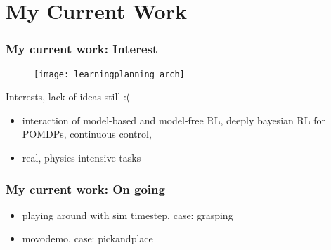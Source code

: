 \section{My Current Work}

\begin{frame}
\frametitle{My current work: Interest}

\begin{figure}
    \centering
    \texttt{[image: learningplanning\_arch]}
\end{figure}

Interests, lack of ideas still :(
\begin{itemize}
  \item interaction of model-based and model-free RL,
  deeply bayesian RL for POMDPs, continuous control,
  \item real, physics-intensive tasks
\end{itemize}
\end{frame}

\begin{frame}
\frametitle{My current work: On going}
\begin{itemize}
  \item playing around with sim timestep, case: grasping
  \item movodemo, case: pickandplace
\end{itemize}
\end{frame}


